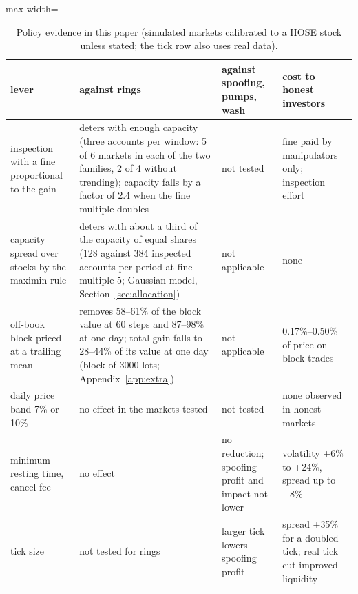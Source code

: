 \begin{table}[t]
\centering\footnotesize
\begin{adjustbox}{max width=\linewidth}
\begin{tabular}{p{3.1cm}p{4.2cm}p{3.6cm}p{3.6cm}}
\toprule
lever & against rings & against spoofing, pumps, wash & cost to honest investors\\
\midrule
inspection with a fine proportional to the gain & deters with enough capacity (three accounts per window: 5 of 6 markets in each of the two families, 2 of 4 without trending); capacity falls by a factor of 2.4 when the fine multiple doubles & not tested & fine paid by manipulators only; inspection effort\\
capacity spread over stocks by the maximin rule & deters with about a third of the capacity of equal shares (128 against 384 inspected accounts per period at fine multiple 5; Gaussian model, Section~\ref{sec:allocation}) & not applicable & none\\
off-book block priced at a trailing mean & removes 58--61\% of the block value at 60 steps and 87--98\% at one day; total gain falls to 28--44\% of its value at one day (block of 3000 lots; Appendix~\ref{app:extra}) & not applicable & 0.17\%--0.50\% of price on block trades\\
daily price band 7\% or 10\% & no effect in the markets tested & not tested & none observed in honest markets\\
minimum resting time, cancel fee & no effect & no reduction; spoofing profit and impact not lower & volatility +6\% to +24\%, spread up to +8\%\\
tick size & not tested for rings & larger tick lowers spoofing profit & spread +35\% for a doubled tick; real tick cut improved liquidity\\
\bottomrule
\end{tabular}
\end{adjustbox}
\caption{Policy evidence in this paper (simulated markets calibrated to a HOSE stock unless stated; the tick row also uses real data).}\label{tab:summary}
\end{table}
